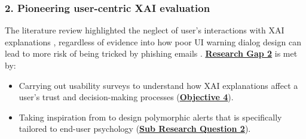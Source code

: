 
\subsubsection*{2. Pioneering user-centric XAI evaluation}
The literature review highlighted the neglect of user's interactions with XAI explanations \citep{vo2024securing}, regardless of evidence into how poor UI warning dialog design can lead to more risk of being tricked by phishing emails \citep{greco2023explaining}. \hyperref[research-gap-2]{\uline{\textbf{Research Gap 2}}} is met by:

\begin{itemize}
  \item Carrying out usability surveys to understand how XAI explanations affect a user's trust and decision-making processes (\hyperref[objective-4]{\uline{\textbf{Objective 4}}}).
  \item Taking inspiration from \cite{anderson2015polymorphic} to design polymorphic alerts that is specifically tailored to end-user psychology (\hyperref[sub-research-q2]{\uline{\textbf{Sub Research Question 2}}}).
\end{itemize}
